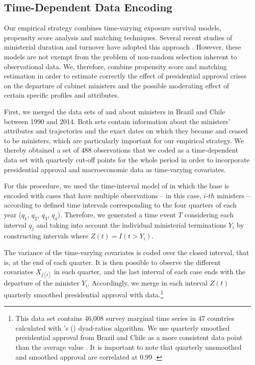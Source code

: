 \documentclass[12pt,halfline,a4paper]{ouparticle}
\begin{document}
\subsection{Time-Dependent Data Encoding}
\label{sec3.1}

Our empirical strategy combines time-varying exposure survival models, propensity score analysis and matching techniques. Several recent studies of ministerial duration and turnover have adopted this approach \citep{Berlinski2007, Berlinski2010, Camerlo2015a, Kerby2015, MartinezGallardo2014, QuirozFlores2015}. However, these models are not exempt from the problem of non-random selection inherent to observational data. We, therefore, combine propensity score and matching estimation in order to estimate correctly the effect of presidential approval crises on the departure of cabinet ministers and the possible moderating effect of certain specific profiles and attributes.

First, we merged the data sets of \cite{Franz2016} and \cite{GonzalezBustamante2022} about ministers in Brazil and Chile between 1990 and 2014. Both sets contain information about the ministers’ attributes and trajectories and the exact dates on which they became and ceased to be ministers, which are particularly important for our empirical strategy. We thereby obtained a set of 488 observations that we coded as a time-dependent data set with quarterly cut-off points for the whole period in order to incorporate presidential approval and macroeconomic data as time-varying covariates.

For this procedure, we used the time-interval model of \cite{Therneau2020} in which the base is encoded with cases that have multiple observations -- in this case, $i$-$th$ ministers -- according to defined time intervals corresponding to the four quarters of each year ($q_{1}$, $q_{2}$, $q_{3}$, $q_{4}$). Therefore, we generated a time event $T$ considering each interval $q_{j}$ and taking into account the individual ministerial terminations $Y_{i}$ by constructing intervals where $Z(t) = I(t > Y_{i})$.

The variance of the time-varying covariates is coded over the closed interval, that is, at the end of each quarter. It is then possible to observe the different covariates $X_{j[i]}$ in each quarter, and the last interval of each case ends with the departure of the minister $Y_{i}$. Accordingly, we merge in each interval $Z(t)$ quarterly smoothed presidential approval with \cite{Carlin2019} data.\footnote{This data set contains 46,008 survey marginal time series in 47 countries calculated with \citeauthor{Stimson2018}’s (\citeyear{Stimson2018}) dyad-ratios algorithm. We use quarterly smoothed presidential approval from Brazil and Chile as a more consistent data point than the average value \citep{Stimson2018}. It is important to note that quarterly unsmoothed and smoothed approval are correlated at 0.99 \citep{Carlin2018}.}
\end{document}
